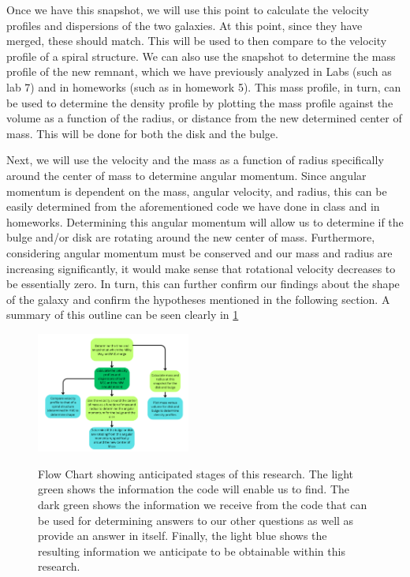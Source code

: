 \documentclass[twocolumn]{aastex631}
\begin{document}
Once we have this snapshot, we will use this point to calculate the velocity profiles and dispersions of the two galaxies. At this point, since they have merged, these should match. This will be used to then compare to the velocity profile of a spiral structure. We can also use the snapshot to determine the mass profile of the new remnant, which we have previously analyzed in Labs (such as lab 7) and in homeworks (such as in homework 5). This mass profile, in turn, can be used to determine the density profile by plotting the mass profile against the volume as a function of the radius, or distance from the new determined center of mass. This will be done for both the disk and the bulge. 

Next, we will use the velocity and the mass as a function of radius specifically around the center of mass to determine angular momentum. Since angular momentum is dependent on the mass, angular velocity, and radius, this can be easily determined from the aforementioned code we have done in class and in homeworks. Determining this angular momentum will allow us to determine if the bulge and/or disk are rotating around the new center of mass. Furthermore, considering angular momentum must be conserved and our mass and radius are increasing significantly, it would make sense that rotational velocity decreases to be essentially zero. 
In turn, this can further confirm our findings about the shape of the galaxy and confirm the hypotheses mentioned in the following section.
A summary of this outline can be seen clearly in \ref{Figure 2}


\begin{figure}
    \centering
    \includegraphics[width = 0.45\textwidth]{400B Flow chart.png}
    \label{Figure 2}
    \caption{Flow Chart showing anticipated stages of this research. The light green shows the information the code will enable us to find. The dark green shows the information we receive from the code that can be used for determining answers to our other questions as well as provide an answer in itself. Finally, the light blue shows the resulting information we anticipate to be obtainable within this research.}
\end{figure}
\end{document}
